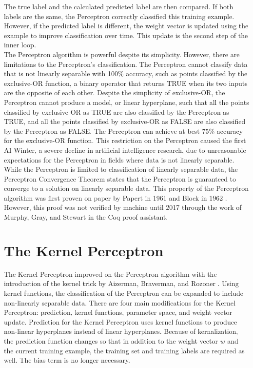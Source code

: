 The true label and the calculated predicted label are then compared. If both labels are the same, the Perceptron correctly classified this training example. However, if the predicted label is different, the weight vector is updated using the example to improve classification over time. This update is the second step of the inner loop.
\\The Perceptron algorithm is powerful despite its simplicity. However, there are limitations to the Perceptron's classification. The Perceptron cannot classify data that is not linearly separable with 100\% accuracy, such as points classified by the exclusive-OR function, a binary operator that returns TRUE when its two inputs are the opposite of each other. Despite the simplicity of exclusive-OR, the Perceptron cannot produce a model, or linear hyperplane, such that all the points classified by exclusive-OR as TRUE are also classified by the Perceptron as TRUE, and all the points classified by exclusive-OR as FALSE are also classified by the Perceptron as FALSE. The Perceptron can achieve at best 75\% accuracy for the exclusive-OR function. This restriction on the Perceptron caused the first AI Winter, a severe decline in artificial intelligence research, due to unreasonable expectations for the Perceptron in fields where data is not linearly separable.
\\While the Perceptron is limited to classification of linearly separable data, the Perceptron Convergence Theorem states that the Perceptron is guaranteed to converge to a solution on linearly separable data. This property of the Perceptron algorithm was first proven on paper by Papert in 1961 \cite{Pap61} and Block in 1962 \cite{Blo62}. However, this proof was not verified by machine until 2017 through the work of Murphy, Gray, and Stewart \cite{MGS17} in the Coq proof assistant. 
\section{The Kernel Perceptron}\label{KernelPerceptronSection}
The Kernel Perceptron improved on the Perceptron algorithm with the introduction of the kernel trick by Aizerman, Braverman, and Rozoner \cite{ABR64}. Using kernel functions, the classification of the Perceptron can be expanded to include non-linearly separable data. There are four main modifications for the Kernel Perceptron: prediction, kernel functions, parameter space, and weight vector update. Prediction for the Kernel Perceptron uses kernel functions to produce non-linear hyperplanes instead of linear hyperplanes. Because of kernalization, the prediction function changes so that in addition to the weight vector $w$ and the current training example, the training set and training labels are required as well. The bias term is no longer necessary.

